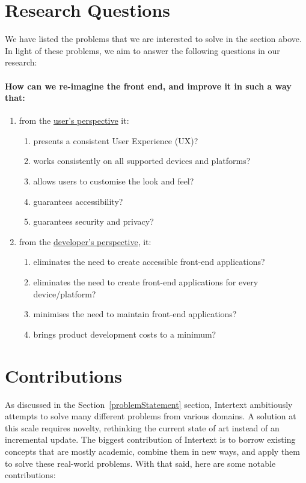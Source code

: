 \section{Research Questions} \label{researchQuestions}

We have listed the problems that we are interested to solve in the section above. In light of these problems, we aim to answer the following questions in our research:

\paragraph{How can we re-imagine the front end, and improve it in such a way that:}
\begin{enumerate}
  \item from the \underline{user's perspective} it:
  \begin{enumerate}
    \item presents a consistent User Experience (UX)?
    \item works consistently on all supported devices and platforms?
    \item allows users to customise the look and feel?
    \item guarantees accessibility?
    \item guarantees security and privacy?
  \end{enumerate}
  \item from the \underline{developer's perspective}, it:
  \begin{enumerate}
    \item eliminates the need to create accessible front-end applications?
    \item eliminates the need to create front-end applications for every device/platform?
    \item minimises the need to maintain front-end applications?
    \item brings product development costs to a minimum?
    
  \end{enumerate}
\end{enumerate}

\section{Contributions} \label{contributions}

As discussed in the Section~\ref{problemStatement} section, Intertext ambitiously attempts to solve many different problems from various domains. A solution at this scale requires novelty, rethinking the current state of art instead of an incremental update. The biggest contribution of Intertext is to borrow existing concepts that are mostly academic, combine them in new ways, and apply them to solve these real-world problems. With that said, here are some notable contributions:

